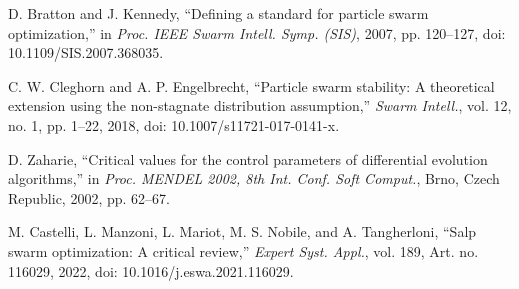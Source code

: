 D. Bratton and J. Kennedy, ``Defining a standard for particle swarm optimization,'' in \textit{Proc. IEEE Swarm Intell. Symp. (SIS)}, 2007, pp. 120--127, doi: 10.1109/SIS.2007.368035.

C. W. Cleghorn and A. P. Engelbrecht, ``Particle swarm stability: A theoretical extension using the non-stagnate distribution assumption,'' \textit{Swarm Intell.}, vol. 12, no. 1, pp. 1--22, 2018, doi: 10.1007/s11721-017-0141-x.

D. Zaharie, ``Critical values for the control parameters of differential evolution algorithms,'' in \textit{Proc. MENDEL 2002, 8th Int. Conf. Soft Comput.}, Brno, Czech Republic, 2002, pp. 62--67.

M. Castelli, L. Manzoni, L. Mariot, M. S. Nobile, and A. Tangherloni, ``Salp swarm optimization: A critical review,'' \textit{Expert Syst. Appl.}, vol. 189, Art. no. 116029, 2022, doi: 10.1016/j.eswa.2021.116029.
